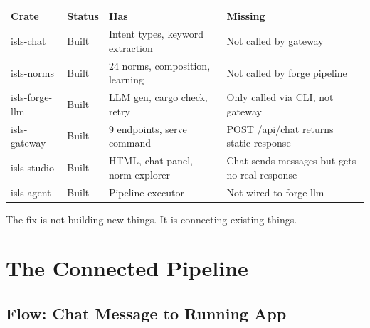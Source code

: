 \documentclass[11pt,a4paper]{article}
\begin{document}
\begin{center}
\small
\begin{tabular}{lllp{4.5cm}}
\toprule
\textbf{Crate} & \textbf{Status} & \textbf{Has} & \textbf{Missing} \\
\midrule
isls-chat & Built & Intent types, keyword extraction & Not called by gateway \\
isls-norms & Built & 24 norms, composition, learning & Not called by forge pipeline \\
isls-forge-llm & Built & LLM gen, cargo check, retry & Only called via CLI, not gateway \\
isls-gateway & Built & 9 endpoints, serve command & POST /api/chat returns static response \\
isls-studio & Built & HTML, chat panel, norm explorer & Chat sends messages but gets no real response \\
isls-agent & Built & Pipeline executor & Not wired to forge-llm \\
\bottomrule
\end{tabular}
\end{center}

The fix is not building new things. It is connecting existing things.

\section{The Connected Pipeline}

\subsection{Flow: Chat Message to Running App}
\end{document}
